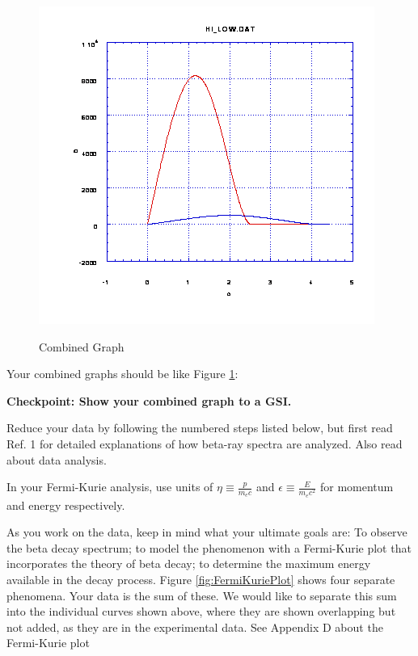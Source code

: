 \documentclass{../lab}
\begin{document}
\begin{figure}[h]
\begin{minipage}{0.32\linewidth}
    \end{minipage} \hfill
    \begin{minipage}{0.32\linewidth}
        \href{http://experimentationlab.berkeley.edu/sites/default/files/images/BRAimage022.gif}{\includegraphics[width=0.8\linewidth]{images/BRAimage022.png}}
    \caption{Combined Graph}
    \label{fig:Combined}
    \end{minipage}
\end{figure}

Your combined graphs should be like Figure \ref{fig:Combined}:

\textbf{Checkpoint: Show your combined graph to a GSI.}

Reduce your data by following the numbered steps listed below, but first read Ref. 1 for detailed explanations of how beta-ray spectra are analyzed. Also read about data analysis.

In your Fermi-Kurie analysis, use units of $\eta \equiv \frac {p}{m_e c}$ and $\epsilon \equiv \frac{E}{m_e c^2}$ for momentum and energy respectively.

As you work on the data, keep in mind what your ultimate goals are: To observe the beta decay spectrum; to model the phenomenon with a Fermi-Kurie plot that incorporates the theory of beta decay; to determine the maximum energy available in the decay process. Figure \ref{fig:FermiKuriePlot} shows four separate phenomena. Your data is the sum of these. We would like to separate this sum into the individual curves shown above, where they are shown overlapping but not added, as they are in the experimental data. See Appendix D about the Fermi-Kurie plot
\end{document}
